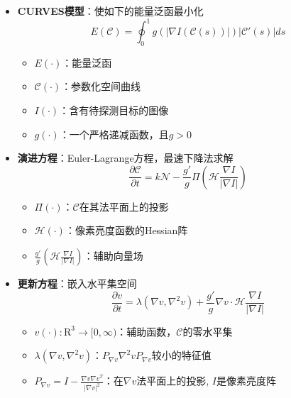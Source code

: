 \begin{frame}
\begin{itemize}
\item \textbf{CURVES模型}：使如下的能量泛函最小化
\begin{equation*}
E(\mathcal C) = \oint_0^1 g\left( \left| \nabla I \left( \mathcal{C} \left(  s \right) \right) \right| \right) \left| \mathcal{C}'\left( s \right) \right| ds
\end{equation*}
\begin{itemize}
\item $E(\cdot)$：能量泛函
\item $\mathcal{C}(\cdot)$：参数化空间曲线
\item $I(\cdot)$：含有待探测目标的图像
\item $g(\cdot)$：一个严格递减函数，且$g > 0$
\end{itemize}
\end{itemize}
\end{frame}

\begin{frame}
\begin{itemize}
\item \textbf{演进方程}：Euler-Lagrange方程，最速下降法求解
\begin{equation*}
\frac{\partial \mathcal{C}}{\partial t} = k \mathcal{N} - \frac{g'}{g} \varPi \left( \mathcal{H} \frac{\nabla I}{\left| \nabla I \right|} \right)
\end{equation*}
\begin{itemize}
\item $\varPi(\cdot)$：$\mathcal{C}$在其法平面上的投影
\item $\mathcal{H}(\cdot)$：像素亮度函数的Hessian阵
\item $\frac{g'}{g} \left( \mathcal{H} \frac{\nabla I}{\left| \nabla I \right|} \right)$：辅助向量场
\end{itemize}
\end{itemize}
\end{frame}

\begin{frame}
\begin{itemize}
\item \textbf{更新方程}：嵌入水平集空间
\begin{equation*}
\frac{\partial v}{\partial t} = \lambda \left( \nabla v, \nabla^2 v \right) + \frac{g'}{g} \nabla v \cdot \mathcal{H} \frac{\nabla I}{ \left| \nabla I \right| }
\end{equation*}
\begin{itemize}
\item $v(\cdot): \mathrm{R}^3 \rightarrow [0, \infty)$：辅助函数，$\mathcal{C}$的零水平集
\item $\lambda \left( \nabla v, \nabla^2 v \right)$：$P_{\nabla v} \nabla^{2} v P_{\nabla v}$较小的特征值
\item $P_{\nabla v} = I - \frac{\nabla v \nabla v^{T}}{\left| \nabla v \right|^{2}}$：在$\nabla v$法平面上的投影, $I$是像素亮度阵
\end{itemize}
\end{itemize}
\end{frame}

